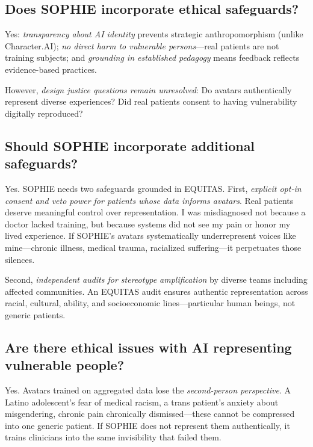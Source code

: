 \documentclass[12pt,twoside]{article}
\begin{document}
\subsection*{Does SOPHIE incorporate ethical safeguards?}

Yes: \emph{transparency about AI identity} prevents strategic anthropomorphism (unlike Character.AI); \emph{no direct harm to vulnerable persons}—real patients are not training subjects; and \emph{grounding in established pedagogy} means feedback reflects evidence-based practices.

However, \emph{design justice questions remain unresolved}: Do avatars authentically represent diverse experiences? Did real patients consent to having vulnerability digitally reproduced?

\subsection*{Should SOPHIE incorporate additional safeguards?}

Yes. SOPHIE needs two safeguards grounded in EQUITAS. First, \emph{explicit opt-in consent and veto power for patients whose data informs avatars}. Real patients deserve meaningful control over representation. I was misdiagnosed not because a doctor lacked training, but because systems did not see my pain or honor my lived experience. If SOPHIE's avatars systematically underrepresent voices like mine—chronic illness, medical trauma, racialized suffering—it perpetuates those silences.

Second, \emph{independent audits for stereotype amplification} by diverse teams including affected communities. An EQUITAS audit ensures authentic representation across racial, cultural, ability, and socioeconomic lines—particular human beings, not generic patients.

\subsection*{Are there ethical issues with AI representing vulnerable people?}

Yes. Avatars trained on aggregated data lose the \emph{second-person perspective}. A Latino adolescent's fear of medical racism, a trans patient's anxiety about misgendering, chronic pain chronically dismissed—these cannot be compressed into one generic patient. If SOPHIE does not represent them authentically, it trains clinicians into the same invisibility that failed them.
\end{document}
